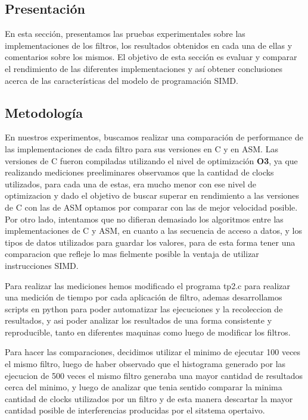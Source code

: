\subsection*{Presentación}
En esta sección, presentamos las pruebas experimentales sobre las implementaciones de los filtros, los resultados obtenidos en cada una de ellas y comentarios sobre los mismos. El objetivo de esta sección es evaluar y comparar el rendimiento de las diferentes implementaciones y así obtener conclusiones acerca de las características del modelo de programación SIMD.

\subsection*{Metodología}

En nuestros experimentos, buscamos realizar una comparación de performance de las implementaciones de cada filtro para sus versiones en C y en ASM.
Las versiones de C fueron compiladas utilizando el nivel de optimización \textbf{O3}, ya que realizando mediciones preeliminares observamos que la cantidad de clocks utilizados, para cada una de estas, era mucho menor con ese nivel de optimizacion y dado el objetivo de buscar superar en rendimiento a las versiones de C con las de ASM optamos por comparar con las de mejor velocidad posible.
Por otro lado, intentamos que no difieran demasiado los algoritmos entre las implementaciones de C y ASM, en cuanto a las secuencia de acceso a datos, y los tipos de datos utilizados para guardar los valores, para de esta forma tener una comparacion que refleje lo mas fielmente posible la ventaja de utilizar instrucciones SIMD.

Para realizar las mediciones hemos modificado el programa tp2.c para realizar una medición de tiempo por cada aplicación de filtro, ademas desarrollamos scripts en python para poder automatizar las ejecuciones y la recoleccion de resultados, y asi poder analizar los resultados de una forma consistente y reproducible, tanto en diferentes maquinas como luego de modificar los filtros. 

Para hacer las comparaciones, decidimos utilizar el minimo de ejecutar 100 veces el mismo filtro, luego de haber observado que el histograma generado por las ejecucion de 500 veces el mismo filtro generaba una mayor cantidad de resultados cerca del minimo, y luego de analizar que tenia sentido comparar la minima cantidad de clocks utilizados por un filtro y de esta manera descartar la mayor cantidad posible de interferencias producidas por el sitstema opertaivo.

